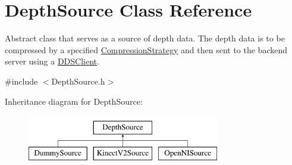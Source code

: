 \hypertarget{class_depth_source}{\section{Depth\+Source Class Reference}
\label{class_depth_source}
}


Abstract class that serves as a source of depth data. The depth data is to be compressed by a specified \hyperlink{class_compression_strategy}{Compression\+Strategy} and then sent to the backend server using a \hyperlink{class_d_d_s_client}{D\+D\+S\+Client}.  




{\ttfamily \#include $<$Depth\+Source.\+h$>$}

Inheritance diagram for Depth\+Source\+:\begin{figure}[H]
\begin{center}
\leavevmode
\includegraphics[height=2.000000cm]{class_depth_source}
\end{center}
\end{figure}
